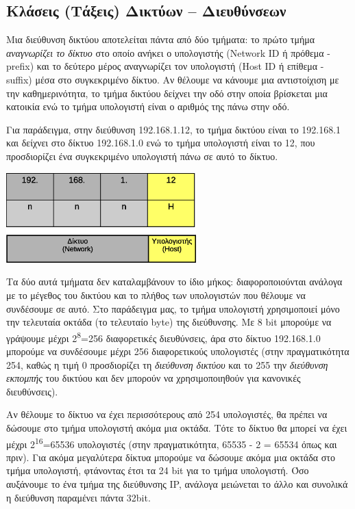 %
%
\subsection{Κλάσεις (Τάξεις) Δικτύων -- Διευθύνσεων}

Μια διεύθυνση δικτύου αποτελείται πάντα από δύο τμήματα: το πρώτο τμήμα \emph{αναγνωρίζει το δίκτυο} στο οποίο ανήκει ο υπολογιστής (Network ΙD ή πρόθεμα - prefix) και το δεύτερο μέρος αναγνωρίζει τον υπολογιστή (Host ID ή επίθεμα - suffix) μέσα στο συγκεκριμένο δίκτυο. Αν θέλουμε να κάνουμε μια αντιστοίχιση με την καθημερινότητα, το τμήμα δικτύου δείχνει την οδό στην οποία βρίσκεται μια κατοικία ενώ το τμήμα υπολογιστή είναι ο αριθμός της πάνω στην οδό.

Για παράδειγμα, στην διεύθυνση 192.168.1.12, το τμήμα δικτύου είναι το 192.168.1 και δείχνει στο δίκτυο 192.168.1.0 ενώ το τμήμα υπολογιστή είναι το 12, που προσδιορίζει ένα συγκεκριμένο υπολογιστή πάνω σε αυτό το δίκτυο.

\begin{center}
  \includegraphics[width=0.55\textwidth]{images/chapter3/3-2}
\end{center}

Τα δύο αυτά τμήματα δεν καταλαμβάνουν το ίδιο μήκος: διαφοροποιούνται ανάλογα με το μέγεθος του δικτύου και το πλήθος των υπολογιστών που θέλουμε να συνδέσουμε σε αυτό. Στο παράδειγμα μας, το τμήμα υπολογιστή χρησιμοποιεί μόνο την τελευταία οκτάδα (το τελευταίο byte) της διεύθυνσης. Με 8 bit μπορούμε να γράψουμε μέχρι 2\textsuperscript{8}=256 διαφορετικές διευθύνσεις, άρα στο δίκτυο 192.168.1.0 μπορούμε να συνδέσουμε μέχρι 256 διαφορετικούς υπολογιστές (στην πραγματικότητα 254, καθώς η τιμή 0 προσδιορίζει τη \emph{διεύθυνση δικτύου} και το 255 την \emph{διεύθυνση εκπομπής} του δικτύου και δεν μπορούν να χρησιμοποιηθούν για κανονικές διευθύνσεις).

Αν θέλουμε το δίκτυο να έχει περισσότερους από 254 υπολογιστές, θα πρέπει να δώσουμε στο τμήμα υπολογιστή ακόμα μια οκτάδα. Τότε το δίκτυο θα μπορεί να έχει μέχρι 2\textsuperscript{16}=65536 υπολογιστές (στην πραγματικότητα, 65535 - 2 = 65534 όπως και πριν). Για ακόμα μεγαλύτερα δίκτυα μπορούμε να δώσουμε ακόμα μια οκτάδα στο τμήμα υπολογιστή, φτάνοντας έτσι τα 24 bit για το τμήμα υπολογιστή.  Όσο αυξάνουμε το ένα τμήμα της διεύθυνσης IP, ανάλογα μειώνεται το άλλο και συνολικά η διεύθυνση παραμένει πάντα 32bit. 

